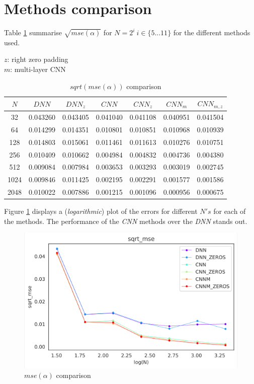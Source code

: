 \documentclass[a4paper, 12pt]{report}
\begin{document}
\pagebreak
\section{Methods comparison}
Table \ref{table:7} summarise $\sqrt{mse(\alpha)}$ for $N=2^i~ i\in\{5...11\}$ for the different methods used.
\begin{table}[!h]
    \sffamily
    \scriptsize
    \caption*{
        $z$: right zero padding\\
        $m$: multi-layer CNN
    }
    \centering
    \begin{tabular}{||c c c c c c c||} 
        \hline
        $N$ & $DNN$ & $DNN_z$ & $CNN$ & $CNN_z$ & $CNN_m$ & $CNN_{m,z}$ \\ [0.5ex] 
        \hline\hline
        32 & 0.043260 & 0.043405 & 0.041040 & 0.041108 & 0.040951 & 0.041504 \\ 
        \hline
        64 & 0.014299 & 0.014351 & 0.010801 & 0.010851 & 0.010968 & 0.010939 \\
        \hline
        128 & 0.014803 & 0.015061 & 0.011461 & 0.011613 & 0.010276 & 0.010751 \\
        \hline
        256 & 0.010409 & 0.010662 & 0.004984 & 0.004832 & 0.004736 & 0.004380 \\
        \hline
        512 & 0.009084 & 0.007984 & 0.003653 & 0.003293 & 0.003019 & 0.002745 \\
        \hline
        1024 & 0.009846 & 0.011425 & 0.002195 & 0.002291 & 0.001577 & 0.001586 \\
        \hline
        2048 & 0.010022 & 0.007886 & 0.001215 & 0.001096 & 0.000956 & 0.000675 \\
        \hline
    \end{tabular}
    \caption{$sqrt(mse(\alpha))$ comparison}
    \label{table:7}
\end{table}

Figure \ref{fig:4} displays a (\textit{logarithmic}) plot of the errors for different $N's$ for each of the methods. The performance of the \textit{CNN} methods over the \textit{DNN} stands out.
\begin{figure}[!h]
\centering
\includegraphics[width=0.7\linewidth]{./sqrt_mse_compare}
\caption{$mse(\alpha)$ comparison}
\label{fig:4}
\end{figure}
\end{document}
